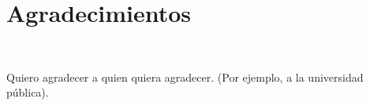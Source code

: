 \chapter*{Agradecimientos}
~\label{acknoledgements}

Quiero agradecer a quien quiera agradecer. (Por ejemplo, a la universidad
pública).